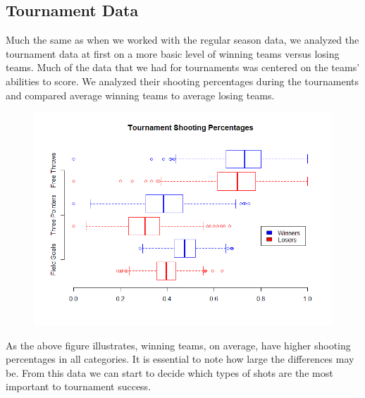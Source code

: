 \documentclass[]{scrartcl}
\begin{document}
\subsection*{Tournament Data}
Much the same as when we worked with the regular season data, we analyzed the tournament data at first on a more basic level of winning teams versus losing teams. Much of the data that we had for tournaments was centered on the teams' abilities to score. We analyzed their shooting percentages during the tournaments and compared average winning teams to average losing teams.
\begin{figure}[H]
	\centering
	\includegraphics[scale=.5]{TourneyShotPercent.png}
\end{figure}
As the above figure illustrates, winning teams, on average, have higher shooting percentages in all categories. It is essential to note how large the differences may be. From this data we can start to decide which types of shots are the most important to tournament success.
\end{document}
